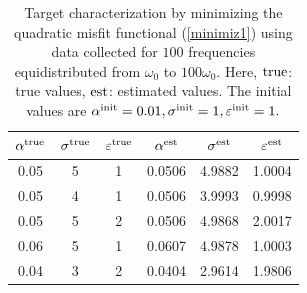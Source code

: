 \documentclass[final]{siamltex}
\numberwithin{equation}{section}
\numberwithin{figure}{section}
\numberwithin{table}{section}
\begin{document}
\begin{table}[!h]
\centering
\begin{tabular}{|c|c|c||c|c|c|}
\hline $\alpha^{{\rm true}}$ & $\sigma^{{\rm true}}$ &
$\varepsilon^{{\rm true}}$ & $\alpha^{{\rm est}}$ & $\sigma^{{\rm
est}}$ & $\varepsilon^{{\rm est}}$\tabularnewline \hline 0.05 & 5
& 1 & 0.0506 & 4.9882 & 1.0004\tabularnewline \hline 0.05 & 4 & 1
& 0.0506 & 3.9993 & 0.9998\tabularnewline \hline 0.05 & 5 & 2 &
0.0506 & 4.9868 & 2.0017\tabularnewline \hline 0.06 & 5 & 1 &
0.0607 & 4.9878 & 1.0003\tabularnewline \hline 0.04 & 3 & 2 &
0.0404 & 2.9614 & 1.9806\tabularnewline \hline
\end{tabular}

\caption{Target characterization by minimizing the quadratic
misfit functional (\ref{minimiz1}) using data collected for $100$
frequencies equidistributed from $\omega_0$ to $100 \omega_0$.
Here, ${\rm true}$: true values, ${\rm est}$: estimated values.
The initial values are $\alpha^{{\rm init}} = 0.01, \sigma^{{\rm
init}} = 1, \varepsilon^{{\rm init}} =1.$ \label{table2}}
\end{table}
\end{document}
